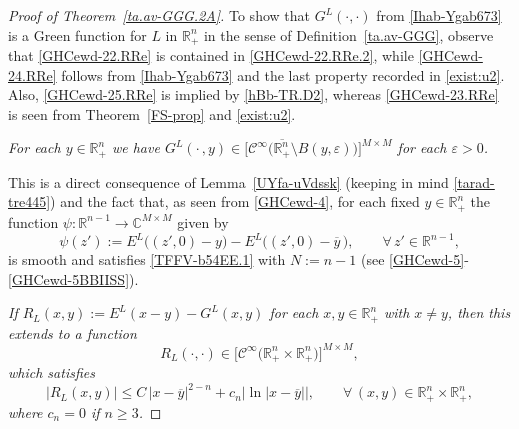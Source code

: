 \documentclass[11pt,reqno]{amsart}
\numberwithin{equation}{section}
\theoremstyle{remark}
\begin{document}
\begin{proof}[Proof of Theorem~\ref{ta.av-GGG.2A}]
To show that $G^L(\cdot,\cdot)$ from \eqref{Ihab-Ygab673} is a Green function for $L$ 
in $\mathbb{R}^n_{+}$ in the sense of Definition~\ref{ta.av-GGG}, observe that \eqref{GHCewd-22.RRe}
is contained in \eqref{GHCewd-22.RRe.2}, while \eqref{GHCewd-24.RRe} follows from 
\eqref{Ihab-Ygab673} and the last property recorded in \eqref{exist:u2}. Also, \eqref{GHCewd-25.RRe}
is implied by \eqref{hBb-TR.D2}, whereas \eqref{GHCewd-23.RRe} is seen from Theorem~\ref{FS-prop}
and \eqref{exist:u2}.

\vskip 0.08in
 \textit{For each $y\in{\mathbb{R}}^n_{+}$ we have 
$G^L(\cdot\,,y)\in\big[{\mathscr{C}}^\infty\big(\overline{{\mathbb{R}}^n_{+}}
\setminus B(y,\varepsilon)\big)\big]^{M\times M}$ for each $\varepsilon>0$.}

\vskip 0.08in
This is a direct consequence of Lemma~\ref{UYfa-uVdssk} 
(keeping in mind \eqref{tarad-tre445}) and the fact that, as seen 
from \eqref{GHCewd-4}, for each fixed $y\in{\mathbb{R}}^n_{+}$ the function 
$\psi:{\mathbb{R}}^{n-1}\to{\mathbb{C}}^{M\times M}$ given by 
%
\begin{equation}\label{GHCewd-4EWs}
\psi(z'):=E^L\big((z',0)-y\big)-E^L\big((z',0)-\overline{y}\,\big),
\qquad\forall\,z'\in{\mathbb{R}}^{n-1},
\end{equation}
%
is smooth and satisfies \eqref{TFFV-b54EE.1} with $N:=n-1$ (see \eqref{GHCewd-5}-\eqref{GHCewd-5BBIISS}).

\vskip 0.08in
 \textit{If $R_L(x,y):=E^L(x-y)-G^L(x,y)$ for each 
$x,y\in{\mathbb{R}}^n_{+}$ with $x\not=y$, then this extends to a function 
%
\begin{equation}\label{Rj-CINF}
R_L(\cdot,\cdot)\in\big[{\mathscr{C}}^\infty\big({\mathbb{R}}^n_{+}\times{\mathbb{R}}^n_{+}\big)\big]^{M\times M},
\end{equation}
%
which satisfies 
%
\begin{equation}\label{Rj}
|R_L(x,y)|\leq C\,|x-{\overline{y}}|^{2-n}
+c_n\big|\!\ln|x-\overline{y}|\big|,
\qquad\forall\,(x,y)\in{\mathbb{R}}^n_{+}\times{\mathbb{R}}^n_{+},
\end{equation}
%
where $c_n=0$ if $n\geq 3$.
}
\vskip 0.08in


\end{proof}
\end{document}
